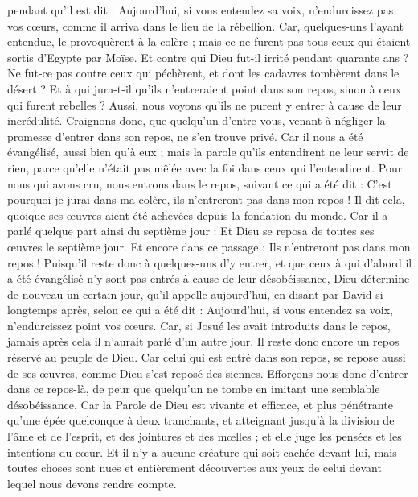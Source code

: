 \begin{multicols}{2}
pendant qu'il est dit : Aujourd'hui, si vous entendez sa voix, n'endurcissez pas vos cœurs, comme il arriva dans le lieu de la rébellion.
Car, quelques-uns l'ayant entendue, le provoquèrent à la colère ; mais ce ne furent pas tous ceux qui étaient sortis d'Egypte par Moïse. 
Et contre qui Dieu fut-il irrité pendant quarante ans ? Ne fut-ce pas contre ceux qui péchèrent, et dont les cadavres tombèrent dans le désert ?
Et à qui jura-t-il qu'ils n'entreraient point dans son repos, sinon à ceux qui furent rebelles ?
Aussi, nous voyons qu'ils ne purent y entrer à cause de leur incrédulité.
\VerseOne{}Craignons donc, que quelqu'un d'entre vous, venant à négliger la promesse d'entrer dans son repos, ne s'en trouve privé.
Car il nous a été évangélisé, aussi bien qu'à eux ; mais la parole qu'ils entendirent ne leur servit de rien, parce qu'elle n'était pas mêlée avec la foi dans ceux qui l'entendirent.
Pour nous qui avons cru, nous entrons dans le repos, suivant ce qui a été dit : C'est pourquoi je jurai dans ma colère, ils n'entreront pas dans mon repos ! Il dit cela, quoique ses œuvres aient été achevées depuis la fondation du monde.
Car il a parlé quelque part ainsi du septième jour : Et Dieu se reposa de toutes ses œuvres le septième jour.
Et encore dans ce passage : Ils n'entreront pas dans mon repos !
Puisqu'il reste donc à quelques-uns d'y entrer, et que ceux à qui d'abord il a été évangélisé n'y sont pas entrés à cause de leur désobéissance,
Dieu détermine de nouveau un certain jour, qu'il appelle aujourd'hui, en disant par David si longtemps après, selon ce qui a été dit : Aujourd'hui, si vous entendez sa voix, n'endurcissez point vos cœurs.
Car, si Josué les avait introduits dans le repos, jamais après cela il n'aurait parlé d'un autre jour.
Il reste donc encore un repos réservé au peuple de Dieu.
Car celui qui est entré dans son repos, se repose aussi de ses œuvres, comme Dieu s'est reposé des siennes.
Efforçons-nous donc d'entrer dans ce repos-là, de peur que quelqu'un ne tombe en imitant une semblable désobéissance.
Car la Parole de Dieu est vivante et efficace, et plus pénétrante qu'une épée quelconque à deux tranchants, et atteignant jusqu'à la division de l'âme et de l'esprit, et des jointures et des mœlles ; et elle juge les pensées et les intentions du cœur.
Et il n'y a aucune créature qui soit cachée devant lui, mais toutes choses sont nues et entièrement découvertes aux yeux de celui devant lequel nous devons rendre compte.

\end{multicols}
